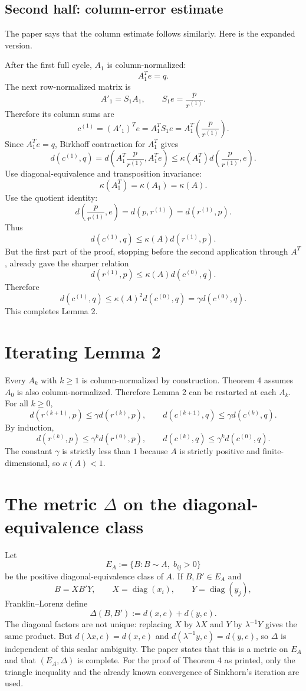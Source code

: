 \subsection*{Second half: column-error estimate}
The paper says that the column estimate follows similarly.  Here is the expanded
version.

After the first full cycle, $A_1$ is column-normalized:
\[
  A_1^Te=q.
\]
The next row-normalized matrix is
\[
  A'_1=S_1A_1,
  \qquad
  S_1e=\frac{p}{r^{(1)}}.
\]
Therefore its column sums are
\[
  c^{(1)}=(A'_1)^Te=A_1^T S_1e
  =A_1^T\left(\frac{p}{r^{(1)}}\right).
\]
Since $A_1^Te=q$, Birkhoff contraction for $A_1^T$ gives
\[
  d(c^{(1)},q)
  =d\left(A_1^T\frac{p}{r^{(1)}},A_1^Te\right)
  \le \kappa(A_1^T)d\left(\frac{p}{r^{(1)}},e\right).
\]
Use diagonal-equivalence and transposition invariance:
\[
  \kappa(A_1^T)=\kappa(A_1)=\kappa(A).
\]
Use the quotient identity:
\[
  d\left(\frac{p}{r^{(1)}},e\right)=d(p,r^{(1)})=d(r^{(1)},p).
\]
Thus
\[
  d(c^{(1)},q)\le \kappa(A)d(r^{(1)},p).
\]
But the first part of the proof, stopping before the second application through
$A^T$, already gave the sharper relation
\[
  d(r^{(1)},p)\le \kappa(A)d(c^{(0)},q).
\]
Therefore
\[
  d(c^{(1)},q)
  \le \kappa(A)^2 d(c^{(0)},q)
  =\gamma d(c^{(0)},q).
\]
This completes Lemma 2.

\section*{Iterating Lemma 2}
Every $A_k$ with $k\ge 1$ is column-normalized by construction.  Theorem 4 assumes
$A_0$ is also column-normalized.  Therefore Lemma 2 can be restarted at each $A_k$.
For all $k\ge 0$,
\[
  d(r^{(k+1)},p)\le \gamma d(r^{(k)},p),
  \qquad
  d(c^{(k+1)},q)\le \gamma d(c^{(k)},q).
\]
By induction,
\[
  d(r^{(k)},p)\le \gamma^k d(r^{(0)},p),
  \qquad
  d(c^{(k)},q)\le \gamma^k d(c^{(0)},q).
\]
The constant $\gamma$ is strictly less than $1$ because $A$ is strictly positive and
finite-dimensional, so $\kappa(A)<1$.

\section*{The metric $\Delta$ on the diagonal-equivalence class}
Let
\[
  E_A:=\{B:B\sim A,\; b_{ij}>0\}
\]
be the positive diagonal-equivalence class of $A$.  If $B,B'\in E_A$ and
\[
  B=XB'Y,
  \qquad
  X=\operatorname{diag}(x_i),
  \qquad
  Y=\operatorname{diag}(y_j),
\]
Franklin--Lorenz define
\[
  \Delta(B,B'):=d(x,e)+d(y,e).
\]
The diagonal factors are not unique: replacing $X$ by $\lambda X$ and $Y$ by
$\lambda^{-1}Y$ gives the same product.  But $d(\lambda x,e)=d(x,e)$ and
$d(\lambda^{-1}y,e)=d(y,e)$, so $\Delta$ is independent of this scalar ambiguity.
The paper states that this is a metric on $E_A$ and that $(E_A,\Delta)$ is complete.
For the proof of Theorem 4 as printed, only the triangle inequality and the already
known convergence of Sinkhorn's iteration are used.

